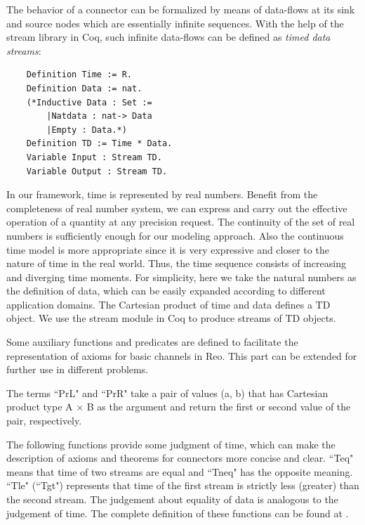 \documentclass{llncs}
\begin{document}
The behavior of a connector can be formalized by means of data-flows at its sink and source nodes which are essentially infinite sequences. With the help of the stream library in Coq, such infinite data-flows can be defined as \emph{timed data streams}:
\begin{verbatim}
    Definition Time := R.
    Definition Data := nat.
    (*Inductive Data : Set :=
        |Natdata : nat-> Data
        |Empty : Data.*)
    Definition TD := Time * Data.
    Variable Input : Stream TD.
    Variable Output : Stream TD.
\end{verbatim}
%
In our framework, time is represented by real numbers. Benefit from the completeness of real number system, we can express and carry out the effective operation of a quantity at any precision request.
The continuity of the set of real numbers is sufficiently enough for our modeling approach. Also the
continuous time model is more appropriate since it is very expressive and closer to the nature of time in the real world. Thus, the time sequence consists of increasing and diverging time moments. For simplicity, here we take the natural numbers as the definition of data, which can be easily expanded according to different application domains. The Cartesian product of time and data defines a TD object.
We use the stream module in Coq to produce streams of TD objects.

Some auxiliary functions and predicates are defined to facilitate the representation of axioms for basic channels in Reo. This part can be extended for further use in different problems.

The terms ``PrL" and ``PrR" take a pair of values (a, b) that has Cartesian product type A $\times$ B as the argument and return the first or second value of the pair, respectively.

The following functions provide some judgment of time, which can make
the description of axioms and theorems for connectors more concise and
clear. ``Teq" means that time of two streams are equal and ``Tneq" has the
opposite meaning. ``Tle"  (``Tgt") represents that time of the first stream is
strictly less (greater) than the second stream. The judgement about
equality of data is analogous to the judgement of time. The complete
definition of these functions can be found at \cite{reo2coqfile}.
\end{document}
